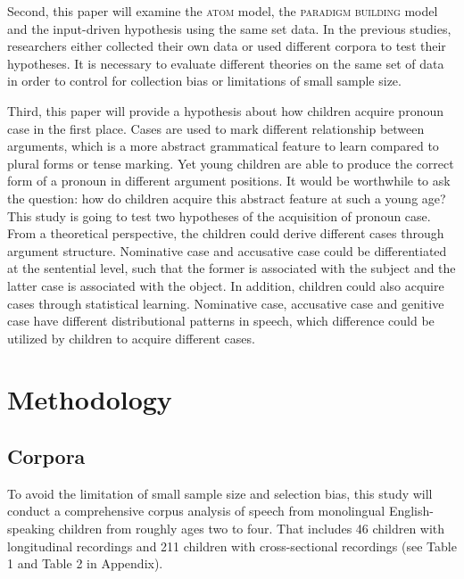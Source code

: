 \documentclass[a4paper,12pt]{article}
\begin{document}
Second, this paper will examine the \textsc{atom} model, the \textsc{paradigm building} model and the input-driven hypothesis using the same set data. In the previous studies, researchers either collected their own data or used different corpora to test their hypotheses. It is necessary to evaluate different theories on the same set of data in order to control for collection bias or limitations of small sample size. 

Third, this paper will provide a hypothesis about how children acquire pronoun case in the first place. Cases are used to mark different relationship between arguments, which is a more abstract grammatical feature to learn compared to plural forms or tense marking. Yet young children are able to produce the correct form of a pronoun in different argument positions. It would be worthwhile to ask the question: how do children acquire this abstract feature at such a young age? This study is going to test two hypotheses of the acquisition of pronoun case. From a theoretical perspective, the children could derive different cases through argument structure. Nominative case and accusative case could be differentiated at the sentential level, such that the former is associated with the subject and the latter case is associated with the object. In addition, children could also acquire cases through statistical learning. Nominative case, accusative case and genitive case have different distributional patterns in speech, which difference could be utilized by children to acquire different cases. 

\section{Methodology}
\subsection{Corpora}
To avoid the limitation of small sample size and selection bias, this study will conduct a comprehensive corpus analysis of speech from monolingual English-speaking children from roughly ages two to four. That includes 46 children with longitudinal recordings and 211 children with cross-sectional recordings (see Table 1 and Table 2 in Appendix).
\end{document}
